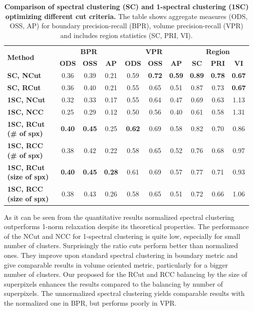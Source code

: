 \begin{table}[htbp]
\renewcommand{\arraystretch}{1.3}
\centering
\scriptsize
\begin{tabular}{|l||c|c|c||c|c|c||c|c|c||}
\hline 
\multirow{2}{*}{\textbf{Method}} & \multicolumn{3}{c||}{\textbf{BPR}} & \multicolumn{3}{c||}{\textbf{VPR}}& \multicolumn{3}{c||}{\textbf{Region}}\\
\cline{2-10}
& \textbf{ODS}  & \textbf{OSS} & \textbf{AP}
& \textbf{ODS} & \textbf{OSS} & \textbf{AP}
& \textbf{SC} & \textbf{PRI} & \textbf{VI} \\
\hline
\hline
\textbf{SC, NCut} & 0.36 & 0.39 & 0.21 & 0.59 &\textbf{0.72} & \textbf{0.59} & \textbf{0.89} & \textbf{0.78} & \textbf{0.67} \\
\hline
\textbf{SC, RCut} & 0.36 & 0.40 & 0.21 & 0.55 & 0.65 & 0.51 & 0.87 & 0.73 & \textbf{0.67} \\
\hline
\hline
\textbf{1SC, NCut} & 0.32 & 0.33 & 0.17 & 0.55 & 0.64 & 0.47 & 0.69 & 0.63 & 1.13 \\
\hline
\textbf{1SC, NCC} & 0.25 & 0.29 & 0.12 & 0.50 & 0.56 & 0.40 & 0.61 & 0.58 & 1.31 \\
\hline
\textbf{1SC, RCut (\# of spx)} &\textbf{0.40} & \textbf{0.45} & 0.25 & \textbf{0.62} & 0.69 & 0.58 & 0.82 & 0.70 & 0.86 \\
\hline
\textbf{1SC, RCC (\# of spx)} & 0.38 & 0.42 & 0.22 & 0.58 & 0.65 & 0.52 & 0.76 & 0.68 & 0.97 \\
\hline
\textbf{1SC, RCut (size of spx)} & \textbf{0.40} & \textbf{0.45} & \textbf{0.28} & 0.61 & 0.69 & 0.57 & 0.77 & 0.71 & 0.93 \\
\hline
\textbf{1SC, RCC (size of spx)} & 0.38 & 0.43 & 0.26 & 0.58 & 0.65 & 0.51 & 0.72 & 0.66 & 1.06 \\
\hline
\end{tabular}
 \caption{{\bf Comparison of spectral clustering (SC) and 1-spectral clustering (1SC) optimizing different cut criteria.} 
The table shows aggregate measures (ODS, OSS, AP) for boundary precision-recall (BPR), volume precision-recall (VPR) and 
includes region statistics (SC, PRI, VI).}
\label{tab:sc_comparison}
\end{table}
As it can be seen from the quantitative results normalized spectral clustering outperforms 1-norm relaxation despite its theoretical properties. The performance of the NCut and NCC for 1-spectral clustering is quite low,
especially for small number of clusters. Surprisingly the ratio cuts perform better than normalized ones. They improve upon standard spectral clustering in boundary metric and give comparable results in volume oriented metric, 
particularly for a bigger number of clusters. Our proposed for the RCut and RCC balancing by the size of superpixels enhances the results compared to the balancing by number of superpixels. 
The unnormalized spectral clustering yields comparable results with the normalized one in BPR, but performs poorly in VPR. 

